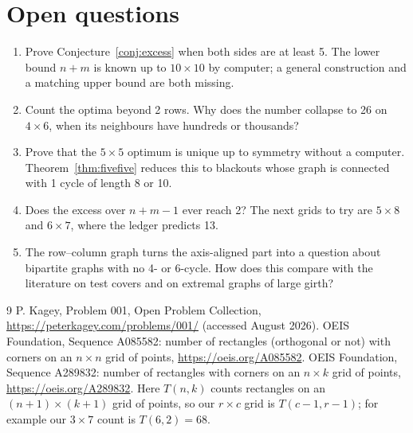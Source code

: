 \documentclass[11pt]{article}
\theoremstyle{definition}
\theoremstyle{remark}
\begin{document}
\section{Open questions}\label{sec:open}

\begin{enumerate}[leftmargin=*,itemsep=2pt]
\item Prove Conjecture~\ref{conj:excess} when both sides are at least 5. The lower bound $n+m$ is
known up to $10\times10$ by computer; a general construction and a matching upper bound are both
missing.
\item Count the optima beyond 2 rows. Why does the number collapse to 26 on $4\times6$, when its
neighbours have hundreds or thousands?
\item Prove that the $5\times5$ optimum is unique up to symmetry without a computer.
Theorem~\ref{thm:fivefive} reduces this to blackouts whose graph is connected with 1 cycle of
length 8 or 10.
\item Does the excess over $n+m-1$ ever reach 2? The next grids to try are $5\times8$ and
$6\times7$, where the ledger predicts 13.
\item The row--column graph turns the axis-aligned part into a question about bipartite graphs
with no 4- or 6-cycle. How does this compare with the literature on test covers and on extremal
graphs of large girth?
\end{enumerate}

\begin{thebibliography}{9}
 P. Kagey, Problem 001, Open Problem Collection,
\url{https://peterkagey.com/problems/001/} (accessed August 2026).
 OEIS Foundation, Sequence A085582: number of rectangles (orthogonal or not)
with corners on an $n\times n$ grid of points, \url{https://oeis.org/A085582}.
 OEIS Foundation, Sequence A289832: number of rectangles with corners on an
$n\times k$ grid of points, \url{https://oeis.org/A289832}. Here $T(n,k)$ counts rectangles on an
$(n+1)\times(k+1)$ grid of points, so our $r\times c$ grid is $T(c-1,r-1)$; for example our
$3\times7$ count is $T(6,2)=68$.
\end{thebibliography}
\end{document}
